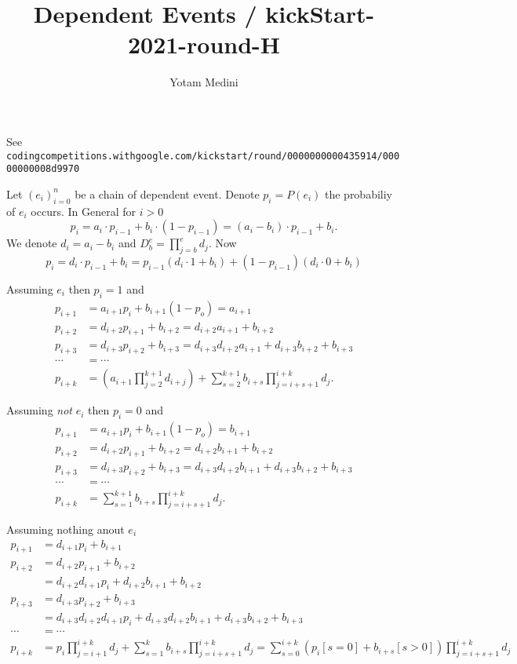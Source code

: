 \documentclass[12pt]{article}
\title{Dependent Events / kickStart-2021-round-H}
\author{Yotam Medini}
\begin{document}
\maketitle

See \texttt{codingcompetitions.withgoogle.com/kickstart/round/0000000000435914/00000000008d9970}

Let \((e_i)_{i=0}^n\) be a chain of dependent event.
Denote \(p_i = P(e_i)\) the probabiliy of \(e_i\) occurs.
In General for \(i > 0\)
\begin{equation*}
p_i 
  = a_i\cdot p_{i-1} + b_i\cdot (1 - p_{i-1})
  = (a_i - b_i)\cdot p_{i-1} + b_i.
\end{equation*}
We denote \(d_i = a_i - b_i\) and  \(D_b^e = \prod_{j=b}^e d_j\).
Now
\begin{equation*}
p_i = d_i\cdot p_{i-1} + b_i %
= p_{i-1}(d_i\cdot 1 + b_i) + (1 - p_{i-1})(d_i\cdot 0 + b_i)
\end{equation*}

Assuming \(e_i\) then \(p_i = 1\) and
\begin{align*}
p_{i+1} &= a_{i+1} p_i + b_{i+1}(1 - p_o) = a_{i+1} \\
p_{i+2} &= d_{i+2}p_{i+1} + b_{i+2} = d_{i+2}a_{i+1} + b_{i+2} \\
p_{i+3} &= d_{i+3}p_{i+2} + b_{i+3} = d_{i+3}d_{i+2}a_{i+1} + d_{i+3}b_{i+2} + b_{i+3} \\
\cdots &= \cdots \\
p_{i+k} &= \left(a_{i+1}\prod_{j=2}^{k+1}d_{i+j}\right)
       +  \sum_{s=2}^{k+1} b_{i+s} \prod_{j=i+s+1}^{i+k} d_j .
\end{align*}


Assuming \emph{not} \(e_i\) then \(p_i = 0\) and
\begin{align*}
p_{i+1} &= a_{i+1} p_i + b_{i+1}(1 - p_o) = b_{i+1} \\
p_{i+2} &= d_{i+2}p_{i+1} + b_{i+2} = d_{i+2}b_{i+1} + b_{i+2} \\
p_{i+3} &= d_{i+3}p_{i+2} + b_{i+3} = d_{i+3}d_{i+2}b_{i+1} + d_{i+3}b_{i+2} + b_{i+3} \\
\cdots &= \cdots \\
p_{i+k} &= \sum_{s=1}^{k+1} b_{i+s} \prod_{j=i+s+1}^{i+k} d_j .
\end{align*}


Assuming nothing anout \(e_i\)
\begin{align*}
p_{i+1} &= d_{i+1}p_i + b_{i+1}\\
p_{i+2} &= d_{i+2}p_{i+1} + b_{i+2} \\
        &= d_{i+2} d_{i+1} p_i + d_{i+2} b_{i+1} + b_{i+2} \\
p_{i+3} &= d_{i+3}p_{i+2} + b_{i+3} \\
       &= d_{i+3}d_{i+2}d_{i+1}p_i + d_{i+3}d_{i+2}b_{i+1} + 
          d_{i+3}b_{i+2} + b_{i+3} \\
\cdots &= \cdots \\
p_{i+k} &= p_i \prod_{j=i+1}^{i+k} d_j +
          \sum_{s=1}^k b_{i+s} \prod_{j=i+s+1}^{i+k} d_j 
        = \sum_{s=0}^{i+k} (p_i[s=0] + b_{i+s}[s>0]) \prod_{j=i+s+1}^{i+k} d_j \\
\end{align*}
\end{document}
